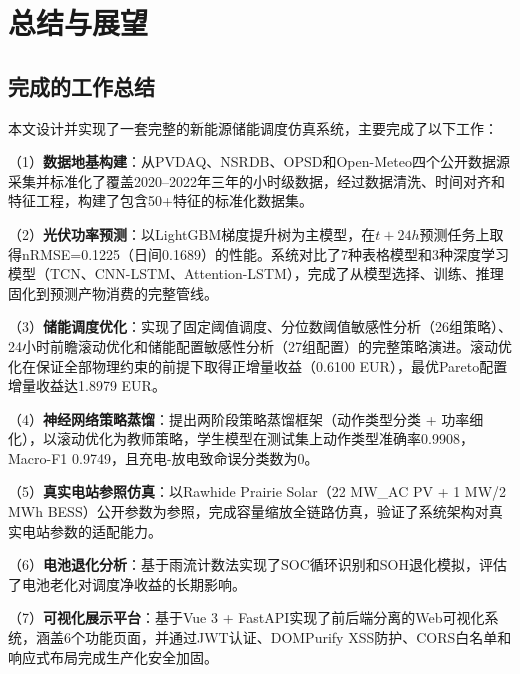 \documentclass[12pt,a4paper]{ctexbook}
\begin{document}
\chapter{总结与展望}

\section{完成的工作总结}

本文设计并实现了一套完整的新能源储能调度仿真系统，主要完成了以下工作：

（1）\textbf{数据地基构建}：从PVDAQ、NSRDB、OPSD和Open-Meteo四个公开数据源采集并标准化了覆盖2020--2022年三年的小时级数据，经过数据清洗、时间对齐和特征工程，构建了包含50+特征的标准化数据集。\cite{pvdaq-nrel,nsrdb-nrel,opsd-datapackage-2020,opsd-wiese-2019,open-meteo-2023}

（2）\textbf{光伏功率预测}：以LightGBM梯度提升树为主模型，在$t+24h$预测任务上取得nRMSE=0.1225（日间0.1689）的性能。系统对比了7种表格模型和3种深度学习模型（TCN、CNN-LSTM、Attention-LSTM），完成了从模型选择、训练、推理固化到预测产物消费的完整管线。\cite{lightgbm-2017,tcn-wan-2019,wang-cnn-lstm-2019,qu-attention-cnnlstm-2021}

（3）\textbf{储能调度优化}：实现了固定阈值调度、分位数阈值敏感性分析（26组策略）、24小时前瞻滚动优化和储能配置敏感性分析（27组配置）的完整策略演进。滚动优化在保证全部物理约束的前提下取得正增量收益（0.6100 EUR），最优Pareto配置增量收益达1.8979 EUR。\cite{bess-review-2023,bo-two-stage-rolling-2025,li-mpc-microgrid-2025}

（4）\textbf{神经网络策略蒸馏}：提出两阶段策略蒸馏框架（动作类型分类 + 功率细化），以滚动优化为教师策略，学生模型在测试集上动作类型准确率0.9908，Macro-F1 0.9749，且充电-放电致命误分类数为0。\cite{policy-distillation-2016}

（5）\textbf{真实电站参照仿真}：以Rawhide Prairie Solar（22 MW\_AC PV + 1 MW/2 MWh BESS）公开参数为参照，完成容量缩放全链路仿真，验证了系统架构对真实电站参数的适配能力。\cite{rawhide-nrel}

（6）\textbf{电池退化分析}：基于雨流计数法实现了SOC循环识别和SOH退化模拟，评估了电池老化对调度净收益的长期影响。\cite{battery-degradation-review-2021,rainflow-soc-2022}

（7）\textbf{可视化展示平台}：基于Vue 3 + FastAPI实现了前后端分离的Web可视化系统，涵盖6个功能页面，并通过JWT认证、DOMPurify XSS防护、CORS白名单和响应式布局完成生产化安全加固。\cite{vue3,fastapi,jwt-rfc7519,dompurify,owasp-top10-2021}
\end{document}
